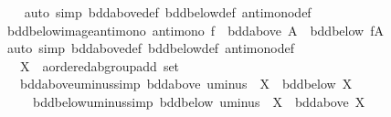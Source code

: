 \begin{isabellebody}
%
\isadelimproof
\ \ %
\endisadelimproof
%
\isatagproof
{}\isamarkupfalse%
\ {\isacharparenleft}{\kern0pt}auto\ simp{\isacharcolon}{\kern0pt}\ bdd{\isacharunderscore}{\kern0pt}above{\isacharunderscore}{\kern0pt}def\ bdd{\isacharunderscore}{\kern0pt}below{\isacharunderscore}{\kern0pt}def\ antimono{\isacharunderscore}{\kern0pt}def{\isacharparenright}{\kern0pt}%
\endisatagproof
{\isafoldproof}%
%
\isadelimproof
\isanewline
%
\endisadelimproof
\isanewline
{}\isamarkupfalse%
\ bdd{\isacharunderscore}{\kern0pt}below{\isacharunderscore}{\kern0pt}image{\isacharunderscore}{\kern0pt}antimono{\isacharcolon}{\kern0pt}\ {\isachardoublequoteopen}antimono\ f\ {\isasymLongrightarrow}\ bdd{\isacharunderscore}{\kern0pt}above\ A\ {\isasymLongrightarrow}\ bdd{\isacharunderscore}{\kern0pt}below\ {\isacharparenleft}{\kern0pt}f{\isacharbackquote}{\kern0pt}A{\isacharparenright}{\kern0pt}{\isachardoublequoteclose}\isanewline
%
\isadelimproof
\ \ %
\endisadelimproof
%
\isatagproof
{}\isamarkupfalse%
\ {\isacharparenleft}{\kern0pt}auto\ simp{\isacharcolon}{\kern0pt}\ bdd{\isacharunderscore}{\kern0pt}above{\isacharunderscore}{\kern0pt}def\ bdd{\isacharunderscore}{\kern0pt}below{\isacharunderscore}{\kern0pt}def\ antimono{\isacharunderscore}{\kern0pt}def{\isacharparenright}{\kern0pt}%
\endisatagproof
{\isafoldproof}%
%
\isadelimproof
\isanewline
%
\endisadelimproof
\isanewline
{}\isamarkupfalse%
\isanewline
\ \ \ X\ {\isacharcolon}{\kern0pt}{\isacharcolon}{\kern0pt}\ {\isachardoublequoteopen}{\isacharprime}{\kern0pt}a{\isacharcolon}{\kern0pt}{\isacharcolon}{\kern0pt}ordered{\isacharunderscore}{\kern0pt}ab{\isacharunderscore}{\kern0pt}group{\isacharunderscore}{\kern0pt}add\ set{\isachardoublequoteclose}\isanewline
\ \ \ bdd{\isacharunderscore}{\kern0pt}above{\isacharunderscore}{\kern0pt}uminus{\isacharbrackleft}{\kern0pt}simp{\isacharbrackright}{\kern0pt}{\isacharcolon}{\kern0pt}\ {\isachardoublequoteopen}bdd{\isacharunderscore}{\kern0pt}above\ {\isacharparenleft}{\kern0pt}uminus\ {\isacharbackquote}{\kern0pt}\ X{\isacharparenright}{\kern0pt}\ {\isasymlongleftrightarrow}\ bdd{\isacharunderscore}{\kern0pt}below\ X{\isachardoublequoteclose}\isanewline
\ \ \ \ \ bdd{\isacharunderscore}{\kern0pt}below{\isacharunderscore}{\kern0pt}uminus{\isacharbrackleft}{\kern0pt}simp{\isacharbrackright}{\kern0pt}{\isacharcolon}{\kern0pt}\ {\isachardoublequoteopen}bdd{\isacharunderscore}{\kern0pt}below\ {\isacharparenleft}{\kern0pt}uminus\ {\isacharbackquote}{\kern0pt}\ X{\isacharparenright}{\kern0pt}\ {\isasymlongleftrightarrow}\ bdd{\isacharunderscore}{\kern0pt}above\ X{\isachardoublequoteclose}\isanewline

\end{isabellebody}
